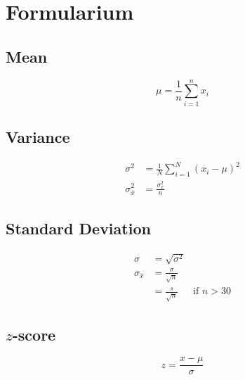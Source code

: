 \documentclass[a4paper]{article}
\begin{document}
\twocolumn

\section{Formularium}

\subsection{Mean}

\begin{equation}
\mu = \frac{1}{n}\sum_{i=1}^n x_i
\end{equation}

\subsection{Variance}

\begin{align}
\sigma^2 &=\frac 1N \sum_{i=1}^N (x_i - \mu)^2 \\
\sigma_{\bar{x}}^2 &= \frac{\sigma_{x}^2}{n} 
\end{align}

\subsection{Standard Deviation}
\begin{align}
\sigma &= \sqrt{\sigma^2} \\
\sigma_{\bar{x}}  &= \frac{\sigma}{\sqrt{n}}  & \\
                  &= \frac{s}{\sqrt{n}}       &\text{if $n > 30$}
\end{align}

% 

\subsection{$z$-score}

\begin{equation}
z = \frac{x- \mu}{\sigma}
\end{equation}
\end{document}
